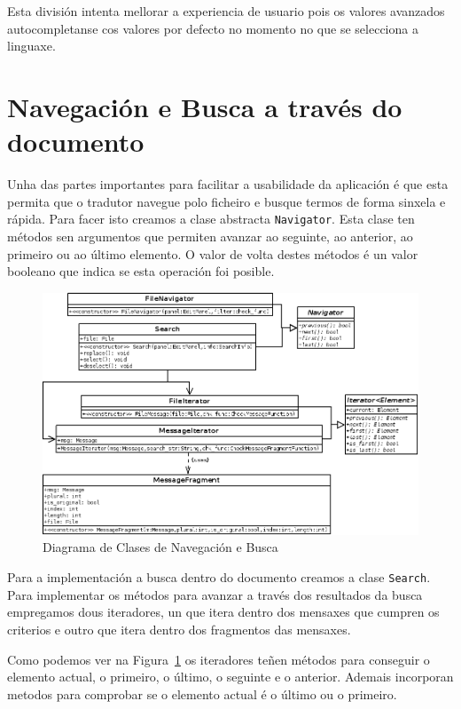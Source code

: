 Esta división intenta mellorar a experiencia de usuario pois os valores avanzados autocompletanse cos valores por defecto no momento no que se selecciona a linguaxe.

\section{Navegación e Busca a través do documento}

Unha das partes importantes para facilitar a usabilidade da aplicación é que esta permita que o tradutor navegue polo ficheiro e busque termos de forma sinxela e rápida. Para facer isto creamos a clase abstracta \lstinline{Navigator}. Esta clase ten métodos sen argumentos que permiten avanzar ao seguinte, ao anterior, ao primeiro ou ao último elemento. O valor de volta destes métodos é un valor booleano que indica se esta operación foi posible.

\begin{figure}[h!]
  \centering
  \includegraphics[width=\textwidth]{img/navigator_diagram.png}
  \caption{Diagrama de Clases de Navegación e Busca}
  \label{fig:nav:diagram}
\end{figure}

Para a implementación a busca dentro do documento creamos a clase \lstinline{Search}. Para implementar os métodos para avanzar a través dos resultados da busca empregamos dous iteradores, un que itera dentro dos mensaxes que cumpren os criterios e outro que itera dentro dos fragmentos das mensaxes.

Como podemos ver na Figura~\ref{fig:nav:diagram} os iteradores teñen métodos para conseguir o elemento actual, o primeiro, o último, o seguinte e o anterior. Ademais incorporan metodos para comprobar se o elemento actual é o último ou o primeiro.

